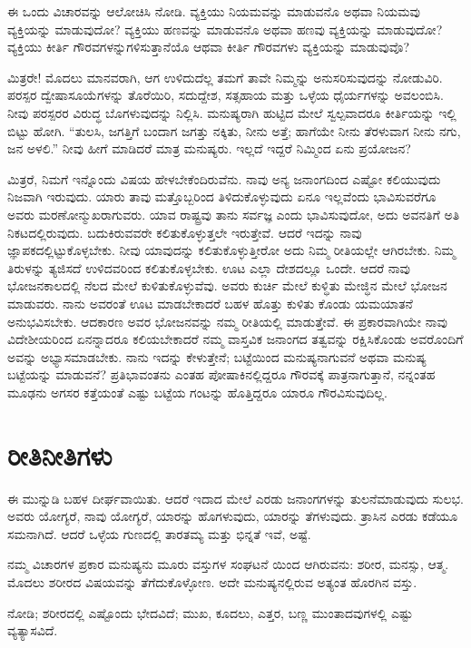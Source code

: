 ಈ ಒಂದು ವಿಚಾರವನ್ನು ಆಲೋಚಿಸಿ ನೋಡಿ. ವ್ಯಕ್ತಿಯು ನಿಯಮವನ್ನು ಮಾಡುವನೊ ಅಥವಾ ನಿಯಮವು ವ್ಯಕ್ತಿಯನ್ನು ಮಾಡುವುದೋ? ವ್ಯಕ್ತಿಯು ಹಣವನ್ನು ಮಾಡುವನೊ ಅಥವಾ ಹಣವು ವ್ಯಕ್ತಿಯನ್ನು ಮಾಡುವುದೋ? ವ್ಯಕ್ತಿಯು ಕೀರ್ತಿ ಗೌರವಗಳನ್ನುಗಳಿಸುತ್ತಾನೆಯೊ ಆಥವಾ ಕೀರ್ತಿ ಗೌರವಗಳು ವ್ಯಕ್ತಿಯನ್ನು ಮಾಡುವುವೊ?

ಮಿತ್ರರೇ! ಮೊದಲು ಮಾನವರಾಗಿ, ಆಗ ಉಳಿದುದೆಲ್ಲ ತಮಗೆ ತಾವೇ ನಿಮ್ಮನ್ನು ಅನುಸರಿಸುವುದನ್ನು ನೋಡುವಿರಿ. ಪರಸ್ಪರ ದ್ವೇಷಾಸೂಯೆಗಳನ್ನು ತೊರೆಯಿರಿ, ಸದುದ್ದೇಶ, ಸತ್ಸಹಾಯ ಮತ್ತು ಒಳ್ಳೆಯ ಧೈರ್ಯಗಳನ್ನು ಅವಲಂಬಿಸಿ. ನೀವು ಪರಸ್ಪರರ ವಿರುದ್ಧ ಬೊಗಳುವುದನ್ನು ನಿಲ್ಲಿಸಿ. ಮನುಷ್ಯರಾಗಿ ಹುಟ್ಟಿದ ಮೇಲೆ ಸ್ವಲ್ಪವಾದರೂ ಕೀರ್ತಿಯನ್ನು ಇಲ್ಲಿ ಬಿಟ್ಟು ಹೋಗಿ. “ತುಲಸಿ, ಜಗತ್ತಿಗೆ ಬಂದಾಗ ಜಗತ್ತು ನಕ್ಕಿತು, ನೀನು ಅತ್ತೆ; ಹಾಗೆಯೇ ನೀನು ತೆರಳುವಾಗ ನೀನು ನಗು, ಜನ ಅಳಲಿ.” ನೀವು ಹೀಗೆ ಮಾಡಿದರೆ ಮಾತ್ರ ಮನುಷ್ಯರು. ಇಲ್ಲದೆ ಇದ್ದರೆ ನಿಮ್ಮಿಂದ ಏನು ಪ್ರಯೋಜನ?

ಮಿತ್ರರೆ, ನಿಮಗೆ ಇನ್ನೊಂದು ವಿಷಯ ಹೇಳಬೇಕೆಂದಿರುವೆನು. ನಾವು ಅನ್ಯ ಜನಾಂಗದಿಂದ ಎಷ್ಟೋ ಕಲಿಯುವುದು ನಿಜವಾಗಿ ಇರುವುದು. ಯಾರು ತಾವು ಮತ್ತೊಬ್ಬರಿಂದ ತಿಳಿದುಕೊಳ್ಳುವುದು ಏನೂ ಇಲ್ಲವೆಂದು ಭಾವಿಸುವರೆಗೂ ಅವರು ಮರಣೋನ್ಮುಖರಾಗುವರು. ಯಾವ ರಾಷ್ಟ್ರವು ತಾನು ಸರ್ವಜ್ಞ ಎಂದು ಭಾವಿಸುವುದೋ, ಅದು ಅವನತಿಗೆ ಅತಿ ನಿಕಟದಲ್ಲಿರುವುದು. ಬದುಕಿರುವವರೇ ಕಲಿತುಕೊಳ್ಳುತ್ತಲೇ ಇರುತ್ತೇವೆ. ಆದರೆ ಇದನ್ನು ನಾವು ಜ್ಞಾಪಕದಲ್ಲಿಟ್ಟುಕೊಳ್ಳಬೇಕು. ನೀವು ಯಾವುದನ್ನು ಕಲಿತುಕೊಳ್ಳುತ್ತೀರೋ ಅದು ನಿಮ್ಮ ರೀತಿಯಲ್ಲೇ ಆಗಿರಬೇಕು. ನಿಮ್ಮ ತಿರುಳನ್ನು ತ್ಯಜಿಸದೆ ಉಳಿದವರಿಂದ ಕಲಿತುಕೊಳ್ಳಬೇಕು. ಊಟ ಎಲ್ಲಾ ದೇಶದಲ್ಲೂ ಒಂದೇ. ಆದರೆ ನಾವು ಭೋಜನಕಾಲದಲ್ಲಿ ನೆಲದ ಮೇಲೆ ಕುಳಿತುಕೊಳ್ಳುವೆವು. ಅವರು ಕುರ್ಚಿ ಮೇಲೆ ಕುಳ್ಧಿತು ಮೇಜ್ಧಿನ ಮೇಲೆ ಭೋಜನ ಮಾಡುವರು. ನಾನು ಅವರಂತೆ ಊಟ ಮಾಡಬೇಕಾದರೆ ಬಹಳ ಹೊತ್ತು ಕುಳಿತು ಕೊಂಡು ಯಮಯಾತನೆ ಅನುಭವಿಸಬೇಕು. ಆದಕಾರಣ ಅವರ ಭೋಜನವನ್ನು ನಮ್ಮ ರೀತಿಯಲ್ಲಿ ಮಾಡುತ್ತೇವೆ. ಈ ಪ್ರಕಾರವಾಗಿಯೇ ನಾವು ವಿದೇಶೀಯರಿಂದ ಏನನ್ನಾದರೂ ಕಲಿಯಬೇಕಾದರೆ ನಮ್ಮ ವಾಸ್ತವಿಕ ಜನಾಂಗದ ತತ್ವವನ್ನು ರಕ್ಷಿಸಿಕೊಂಡು ಅವರೊಂದಿಗೆ ಅವನ್ನು ಅಭ್ಯಾಸಮಾಡಬೇಕು. ನಾನು ಇದನ್ನು ಕೇಳುತ್ತೇನೆ; ಬಟ್ಟೆಯಿಂದ ಮನುಷ್ಯನಾಗುವನೆ ಅಥವಾ ಮನುಷ್ಯ ಬಟ್ಟೆಯನ್ನು ಮಾಡುವನೆ? ಪ್ರತಿಭಾವಂತನು ಎಂತಹ ಪೋಷಾಕಿನಲ್ಲಿದ್ದರೂ ಗೌರವಕ್ಕೆ ಪಾತ್ರನಾಗುತ್ತಾನೆ, ನನ್ನಂತಹ ಮೂಢನು ಅಗಸರ ಕತ್ತೆಯಂತೆ ಎಷ್ಟು ಬಟ್ಟೆಯ ಗಂಟನ್ನು ಹೊತ್ತಿದ್ದರೂ ಯಾರೂ ಗೌರವಿಸುವುದಿಲ್ಲ.

\section{ರೀತಿನೀತಿಗಳು}

ಈ ಮುನ್ನುಡಿ ಬಹಳ ದೀರ್ಘವಾಯಿತು. ಆದರೆ ಇದಾದ ಮೇಲೆ ಎರಡು ಜನಾಂಗಗಳನ್ನು ತುಲನೆಮಾಡುವುದು ಸುಲಭ. ಅವರು ಯೋಗ್ಯರೆ, ನಾವು ಯೋಗ್ಯರೆ, ಯಾರನ್ನು ಹೊಗಳುವುದು, ಯಾರನ್ನು ತೆಗಳುವುದು. ತ್ರಾಸಿನ ಎರಡು ಕಡೆಯೂ ಸಮನಾಗಿದೆ. ಆದರೆ ಒಳ್ಳೆಯ ಗುಣದಲ್ಲಿ ತಾರತಮ್ಯ ಮತ್ತು ಭಿನ್ನತೆ ಇವೆ, ಅಷ್ಟೆ.

ನಮ್ಮ ವಿಚಾರಗಳ ಪ್ರಕಾರ ಮನುಷ್ಯನು ಮೂರು ವಸ್ತುಗಳ ಸಂಘಟನೆ ಯಿಂದ ಆಗಿರುವನು: ಶರೀರ, ಮನಸ್ಸು, ಆತ್ಮ. ಮೊದಲು ಶರೀರದ ವಿಷಯವನ್ನು ತೆಗೆದುಕೊಳ್ಳೋಣ. ಅದೇ ಮನುಷ್ಯನಲ್ಲಿರುವ ಅತ್ಯಂತ ಹೊರಗಿನ ವಸ್ತು.

ನೋಡಿ; ಶರೀರದಲ್ಲಿ ಎಷ್ಟೊಂದು ಭೇದವಿದೆ; ಮುಖ, ಕೂದಲು, ಎತ್ತರ, ಬಣ್ಣ ಮುಂತಾದವುಗಳಲ್ಲಿ ಎಷ್ಟು ವ್ಯತ್ಯಾಸವಿದೆ.


